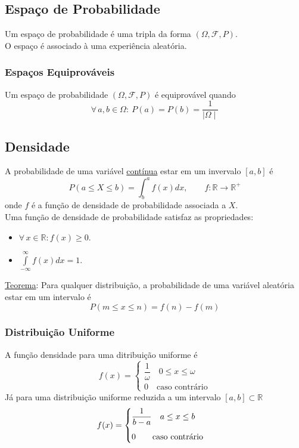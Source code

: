 \documentclass{article}
\begin{document}
\subsection{Espaço de Probabilidade}
Um espaço de probabilidade é uma tripla da forma $(\Omega, \mathcal{F}, P)$. \\
O espaço é associado à uma experiência aleatória.

\subsubsection{Espaços Equiprováveis}
Um espaço de probabilidade $(\Omega, \mathcal{F}, P)$ é equiprovável quando
\[ \forall \, a, b \in \Omega: \> P({a}) = P({b}) = \frac{1}{\mid \Omega \mid} \]



\subsection{Densidade}
A probabilidade de uma variável \uline{contínua} estar em um invervalo $[a,b]$ é
\[ P(a \leq X \leq b) = \int_b^a f(x) dx, \qquad f: \mathbb{R} \to \mathbb{R}^+ \]
onde $f$ é a função de densidade de probabilidade associada a $X$. \\[10pt]
Uma função de densidade de probabilidade satisfaz as propriedades:
\begin{itemize}
  \item $\forall\, x \in \mathbb{R}: f(x) \geq 0$.
  \item $\int\limits_{-\infty}^{\infty} f(x) dx = 1$.
\end{itemize}
\uline{Teorema}: Para qualquer distribuição, a probabilidade de uma variável aleatória estar em um intervalo é
\[ P(m \leq x \leq n) = f(n) - f(m) \]

\subsubsection{Distribuição Uniforme}
A função densidade para uma ditribuição uniforme é
\[
  f(x) = \begin{cases}
          \dfrac{1}{\omega} \quad 0 \leq x \leq \omega \\[10pt]
          0 \quad \text{caso contrário}
         \end{cases}
\]
Já para uma distribuição uniforme reduzida a um intervalo $[a,b] \subset \mathbb{R}$
\[
  f(x) = \begin{cases}
          \dfrac{1}{b - a} \quad a \leq x \leq b \\[10pt]
          0 \qquad \text{caso contrário}
         \end{cases} \\[10pt]
\]
\end{document}
